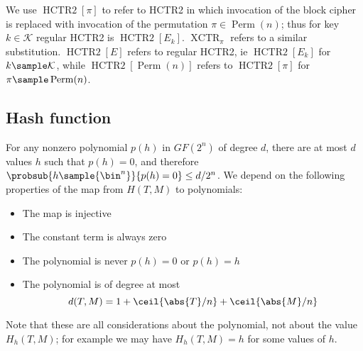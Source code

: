 \documentclass[letterpaper,11pt]{article}
\DeclareMathOperator{\HCTR}{HCTR2}
\DeclareMathOperator{\Perm}{Perm}
\DeclareMathOperator{\XCTR}{XCTR}
\begin{document}
We use \(\HCTR[\pi]\) to refer to HCTR2 in which invocation
of the block cipher is replaced with invocation of the
permutation \(\pi \in \Perm(n)\); thus for key
\(k \in \mathcal{K}\) regular HCTR2 is \(\HCTR[E_k]\).
\(\XCTR_\pi\) refers to a similar substitution.
\(\HCTR[E]\) refers to regular HCTR2,
ie \(\HCTR[E_k]\) for \(k \sample \mathcal{K}\), while
\(\HCTR[\Perm(n)]\) refers to \(\HCTR[\pi]\)
for \(\pi \sample \Perm(n)\).

\subsection{Hash function}\label{hproperties}
For any nonzero polynomial \(p(h)\)
in \(GF(2^n)\) 
of degree \(d\), there are at most \(d\) values \(h\)
such that \(p(h) = 0\), and therefore
\(\probsub{h\sample{\bin^n}}{p(h) = 0} \leq d/2^n\).
We depend on the following properties of the map from 
\(H(T, M)\) to polynomials:
\begin{itemize}
    \item The map is injective
    \item The constant term is always zero
    \item The polynomial is never \(p(h) = 0\) or \(p(h) = h\)
    \item The polynomial is of degree at most
    \begin{displaymath}
        d(T, M) = 1 + \ceil{\abs{T}/n} + \ceil{\abs{M}/n}
    \end{displaymath}
\end{itemize}
Note that these are all considerations about the polynomial,
not about the value \(H_h(T, M)\);
for example we may have \(H_h(T, M) = h\) for some values of \(h\).
\end{document}
